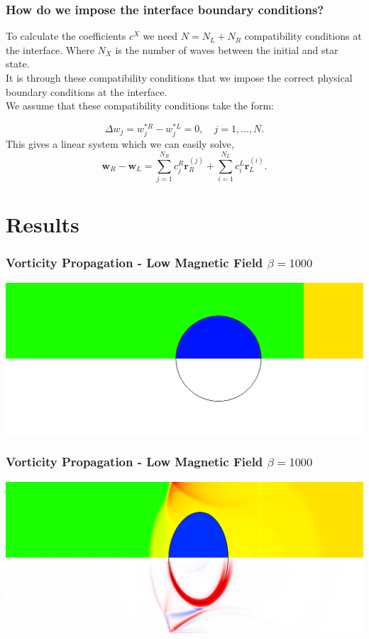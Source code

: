 \documentclass{beamer}
\begin{document}
\begin{frame}
\frametitle{How do we impose the interface boundary conditions?}
To calculate the coefficients $c^X$ we need  $N = N_L + N_R$ compatibility conditions at the interface. Where $N_X$ is the number of waves between the initial and star state.\\
It is through these compatibility conditions that we impose the correct physical boundary conditions at the interface.\\
We assume that these compatibility conditions take the form:

\begin{equation}
\Delta w_j = w^{*R}_j-w^{*L}_j = 0, \quad j = 1,\dots, N.
\end{equation}
This gives a linear system which we can easily solve,
\begin{equation}
\mathbf{w}_R - \mathbf{w}_L = \sum^{N_R}_{j=1}c^R_{j}\mathbf{r}^{(j)}_R +  \sum^{N_L}_{i=1}c^L_{i}\mathbf{r}^{(i)}_L.
\end{equation}
\end{frame}

\section{Results}

\begin{frame}
\frametitle{Vorticity Propagation - Low Magnetic Field $\beta = 1000$}
\includegraphics[width=\textwidth]{../images/SRMHDBubbleBeta1000_t0_crop.png}
\end{frame}

\begin{frame}
\frametitle{Vorticity Propagation - Low Magnetic Field $\beta = 1000$}
\includegraphics[width=\textwidth]{../images/SRMHDBubbleBeta1000_t31_crop.png}
\end{frame}
\end{document}
